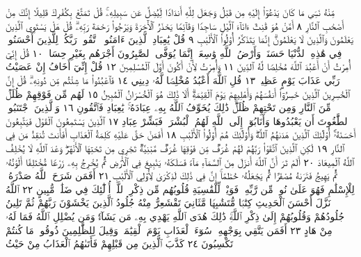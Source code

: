 مِّنْهُ نَسِيَ مَا كَانَ يَدْعُوٓا۟ إِلَيْهِ مِن قَبْلُ وَجَعَلَ لِلَّهِ أَندَادࣰا لِّيُضِلَّ
عَن سَبِيلِهِۦۚ قُلْ تَمَتَّعْ بِكُفْرِكَ قَلِيلًا إِنَّكَ مِنْ أَصْحَٰبِ ٱلنَّارِ ٨
أَمَّنْ هُوَ قَٰنِتٌ ءَانَآءَ ٱلَّيْلِ سَاجِدࣰا وَقَآئِمࣰا يَحْذَرُ ٱلْأٓخِرَةَ
وَيَرْجُوا۟ رَحْمَةَ رَبِّهِۦۗ قُلْ هَلْ يَسْتَوِي ٱلَّذِينَ يَعْلَمُونَ وَٱلَّذِينَ
لَا يَعْلَمُونَۗ إِنَّمَا يَتَذَكَّرُ أُو۟لُوا۟ ٱلْأَلْبَٰبِ ٩ قُلْ يَٰعِبَادِ ٱلَّذِينَ
ءَامَنُوا۟ ٱتَّقُوا۟ رَبَّكُمْۚ لِلَّذِينَ أَحْسَنُوا۟ فِي هَٰذِهِ ٱلدُّنْيَا حَسَنَةࣱۗ
وَأَرْضُ ٱللَّهِ وَٰسِعَةٌۗ إِنَّمَا يُوَفَّى ٱلصَّٰبِرُونَ أَجْرَهُم بِغَيْرِ حِسَابࣲ ١٠
قُلْ إِنِّيٓ أُمِرْتُ أَنْ أَعْبُدَ ٱللَّهَ مُخْلِصࣰا لَّهُ ٱلدِّينَ ١١ وَأُمِرْتُ لِأَنْ أَكُونَ
أَوَّلَ ٱلْمُسْلِمِينَ ١٢ قُلْ إِنِّيٓ أَخَافُ إِنْ عَصَيْتُ رَبِّي عَذَابَ يَوْمٍ
عَظِيمࣲ ١٣ قُلِ ٱللَّهَ أَعْبُدُ مُخْلِصࣰا لَّهُۥ دِينِي ١٤ فَٱعْبُدُوا۟ مَا شِئْتُم مِّن
دُونِهِۦۗ قُلْ إِنَّ ٱلْخَٰسِرِينَ ٱلَّذِينَ خَسِرُوٓا۟ أَنفُسَهُمْ وَأَهْلِيهِمْ يَوْمَ ٱلْقِيَٰمَةِۗ
أَلَا ذَٰلِكَ هُوَ ٱلْخُسْرَانُ ٱلْمُبِينُ ١٥ لَهُم مِّن فَوْقِهِمْ ظُلَلࣱ مِّنَ ٱلنَّارِ
وَمِن تَحْتِهِمْ ظُلَلࣱۚ ذَٰلِكَ يُخَوِّفُ ٱللَّهُ بِهِۦ عِبَادَهُۥۚ يَٰعِبَادِ فَٱتَّقُونِ ١٦
وَٱلَّذِينَ ٱجْتَنَبُوا۟ ٱلطَّٰغُوتَ أَن يَعْبُدُوهَا وَأَنَابُوٓا۟ إِلَى ٱللَّهِ لَهُمُ ٱلْبُشْرَىٰۚ
فَبَشِّرْ عِبَادِ ١٧ ٱلَّذِينَ يَسْتَمِعُونَ ٱلْقَوْلَ فَيَتَّبِعُونَ أَحْسَنَهُۥٓۚ
أُو۟لَٰٓئِكَ ٱلَّذِينَ هَدَىٰهُمُ ٱللَّهُۖ وَأُو۟لَٰٓئِكَ هُمْ أُو۟لُوا۟ ٱلْأَلْبَٰبِ ١٨
أَفَمَنْ حَقَّ عَلَيْهِ كَلِمَةُ ٱلْعَذَابِ أَفَأَنتَ تُنقِذُ مَن فِي ٱلنَّارِ ١٩
لَٰكِنِ ٱلَّذِينَ ٱتَّقَوْا۟ رَبَّهُمْ لَهُمْ غُرَفࣱ مِّن فَوْقِهَا غُرَفࣱ مَّبْنِيَّةࣱ تَجْرِي
مِن تَحْتِهَا ٱلْأَنْهَٰرُۖ وَعْدَ ٱللَّهِ لَا يُخْلِفُ ٱللَّهُ ٱلْمِيعَادَ ٢٠ أَلَمْ تَرَ
أَنَّ ٱللَّهَ أَنزَلَ مِنَ ٱلسَّمَآءِ مَآءࣰ فَسَلَكَهُۥ يَنَٰبِيعَ فِي ٱلْأَرْضِ ثُمَّ
يُخْرِجُ بِهِۦ زَرْعࣰا مُّخْتَلِفًا أَلْوَٰنُهُۥ ثُمَّ يَهِيجُ فَتَرَىٰهُ مُصْفَرࣰّا ثُمَّ
يَجْعَلُهُۥ حُطَٰمًاۚ إِنَّ فِي ذَٰلِكَ لَذِكْرَىٰ لِأُو۟لِي ٱلْأَلْبَٰبِ ٢١
أَفَمَن شَرَحَ ٱللَّهُ صَدْرَهُۥ لِلْإِسْلَٰمِ فَهُوَ عَلَىٰ نُورࣲ مِّن رَّبِّهِۦۚ فَوَيْلࣱ
لِّلْقَٰسِيَةِ قُلُوبُهُم مِّن ذِكْرِ ٱللَّهِۚ أُو۟لَٰٓئِكَ فِي ضَلَٰلࣲ مُّبِينٍ ٢٢
ٱللَّهُ نَزَّلَ أَحْسَنَ ٱلْحَدِيثِ كِتَٰبࣰا مُّتَشَٰبِهࣰا مَّثَانِيَ تَقْشَعِرُّ مِنْهُ
جُلُودُ ٱلَّذِينَ يَخْشَوْنَ رَبَّهُمْ ثُمَّ تَلِينُ جُلُودُهُمْ وَقُلُوبُهُمْ
إِلَىٰ ذِكْرِ ٱللَّهِۚ ذَٰلِكَ هُدَى ٱللَّهِ يَهْدِي بِهِۦ مَن يَشَآءُۚ وَمَن
يُضْلِلِ ٱللَّهُ فَمَا لَهُۥ مِنْ هَادٍ ٢٣ أَفَمَن يَتَّقِي بِوَجْهِهِۦ سُوٓءَ
ٱلْعَذَابِ يَوْمَ ٱلْقِيَٰمَةِۚ وَقِيلَ لِلظَّٰلِمِينَ ذُوقُوا۟ مَا كُنتُمْ تَكْسِبُونَ ٢٤
كَذَّبَ ٱلَّذِينَ مِن قَبْلِهِمْ فَأَتَىٰهُمُ ٱلْعَذَابُ مِنْ حَيْثُ
